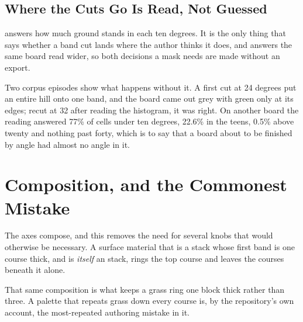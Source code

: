 \subsection{Where the Cuts Go Is Read, Not Guessed}

 answers how much ground stands in each ten
degrees. It is the only thing that says whether a band cut lands where the author
thinks it does, and  answers the same board read wider, so both
decisions a mask needs are made without an export.

Two corpus episodes show what happens without it. A first cut at 24 degrees put an
entire hill onto one band, and the board came out grey with green only at its
edges; recut at 32 after reading the histogram, it was right. On another board the
reading answered 77\% of cells under ten degrees, 22.6\% in the teens, 0.5\% above
twenty and nothing past forty, which is to say that a board about to be finished by
angle had almost no angle in it.

\section{Composition, and the Commonest Mistake}

The axes compose, and this removes the need for several knobs that would otherwise
be necessary. A surface material that is a  stack whose first band is one
course thick, and is \emph{itself} an  stack, rings the top course and
leaves the courses beneath it alone.

That same composition is what keeps a grass ring one block thick rather than three.
A palette that repeats grass down every course is, by the repository's own account,
the most-repeated authoring mistake in it.
